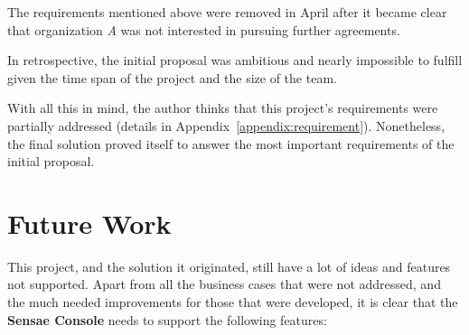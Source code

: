 The requirements mentioned above were removed in April after it became clear that organization \textit{A} was not interested in pursuing further agreements.

In retrospective, the initial proposal was ambitious and nearly impossible to fulfill given the time span of the project and the size of the team.

With all this in mind, the author thinks that this project's requirements were partially addressed (details in Appendix~\ref{appendix:requirement}). Nonetheless, the final solution proved itself to answer the most important requirements of the initial proposal.

\section{Future Work}
\label{sec:conclusion:future}

This project, and the solution it originated, still have a lot of ideas and features not supported. Apart from all the business cases that were not addressed, and the much needed improvements for those that were developed, it is clear that the \textbf{Sensae Console} needs to support the following features:

